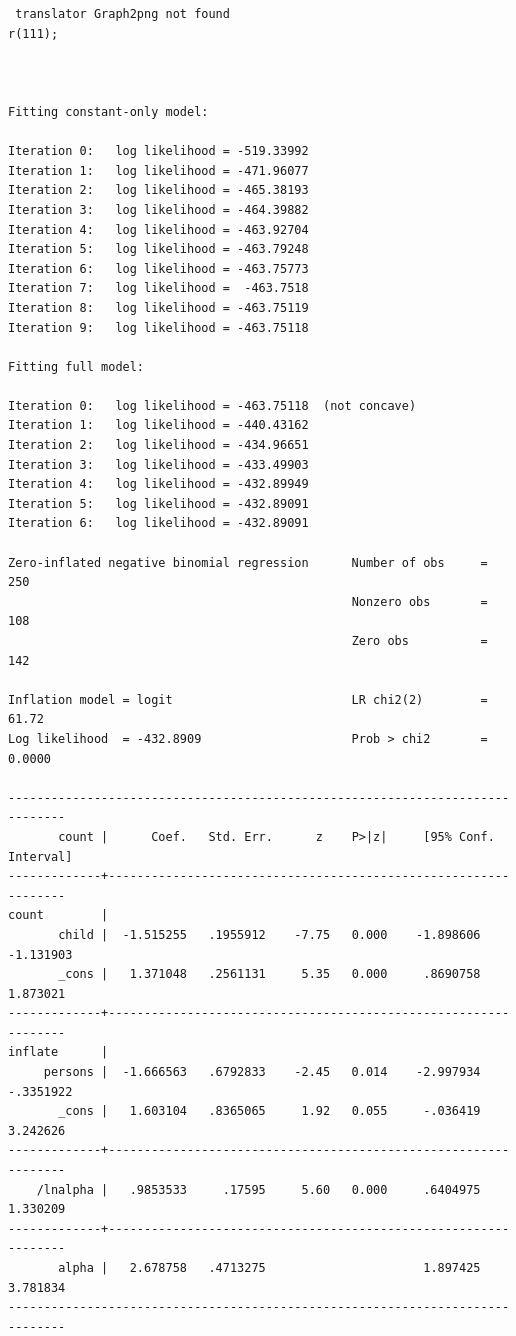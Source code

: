 \documentclass[]{book}
\begin{document}
\begin{verbatim}
 translator Graph2png not found
r(111);



Fitting constant-only model:

Iteration 0:   log likelihood = -519.33992  
Iteration 1:   log likelihood = -471.96077  
Iteration 2:   log likelihood = -465.38193  
Iteration 3:   log likelihood = -464.39882  
Iteration 4:   log likelihood = -463.92704  
Iteration 5:   log likelihood = -463.79248  
Iteration 6:   log likelihood = -463.75773  
Iteration 7:   log likelihood =  -463.7518  
Iteration 8:   log likelihood = -463.75119  
Iteration 9:   log likelihood = -463.75118  

Fitting full model:

Iteration 0:   log likelihood = -463.75118  (not concave)
Iteration 1:   log likelihood = -440.43162  
Iteration 2:   log likelihood = -434.96651  
Iteration 3:   log likelihood = -433.49903  
Iteration 4:   log likelihood = -432.89949  
Iteration 5:   log likelihood = -432.89091  
Iteration 6:   log likelihood = -432.89091  

Zero-inflated negative binomial regression      Number of obs     =        250
                                                Nonzero obs       =        108
                                                Zero obs          =        142

Inflation model = logit                         LR chi2(2)        =      61.72
Log likelihood  = -432.8909                     Prob > chi2       =     0.0000

------------------------------------------------------------------------------
       count |      Coef.   Std. Err.      z    P>|z|     [95% Conf. Interval]
-------------+----------------------------------------------------------------
count        |
       child |  -1.515255   .1955912    -7.75   0.000    -1.898606   -1.131903
       _cons |   1.371048   .2561131     5.35   0.000     .8690758    1.873021
-------------+----------------------------------------------------------------
inflate      |
     persons |  -1.666563   .6792833    -2.45   0.014    -2.997934   -.3351922
       _cons |   1.603104   .8365065     1.92   0.055     -.036419    3.242626
-------------+----------------------------------------------------------------
    /lnalpha |   .9853533     .17595     5.60   0.000     .6404975    1.330209
-------------+----------------------------------------------------------------
       alpha |   2.678758   .4713275                      1.897425    3.781834
------------------------------------------------------------------------------
\end{verbatim}
\end{document}
